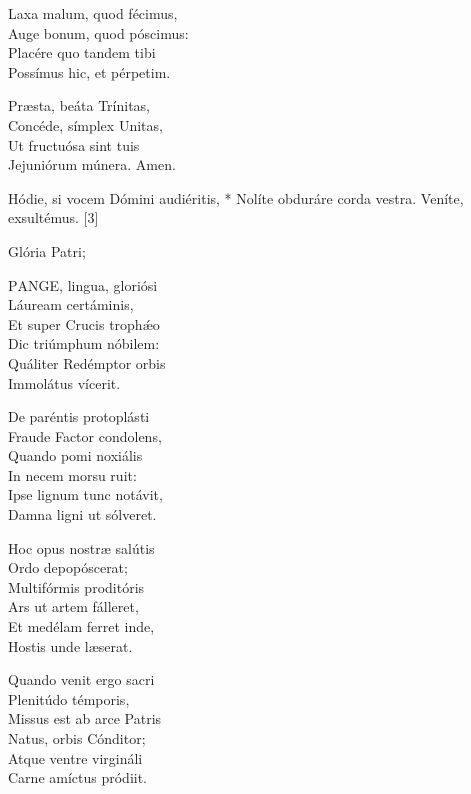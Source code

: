 Laxa malum, quod fécimus,\\
Auge bonum, quod póscimus:\\
Placére quo tandem tibi\\
Possímus hic, et pérpetim.

Præsta, beáta Trínitas,\\
Concéde, símplex Unitas,\\
Ut fructuósa sint tuis\\
Jejuniórum múnera. Amen.


 Hódie, si vocem Dómini audiéritis, * Nolíte obduráre corda vestra.  Veníte, exsultémus. [3]


 Glória Patri; 


\lettrine[lines=2]{P}{ANGE}, lingua, gloriósi\\
Láuream certáminis,\\
Et super Crucis trophǽo\\
Dic triúmphum nóbilem:\\
Quáliter Redémptor orbis\\
Immolátus vícerit.

De paréntis protoplásti\\
Fraude Factor condolens,\\
Quando pomi noxiális\\
In necem morsu ruit:\\
Ipse lignum tunc notávit,\\
Damna ligni ut sólveret.

Hoc opus nostræ salútis\\
Ordo depopóscerat;\\
Multifórmis proditóris\\
Ars ut artem fálleret,\\
Et medélam ferret inde,\\
Hostis unde læserat.

Quando venit ergo sacri\\
Plenitúdo témporis,\\
Missus est ab arce Patris\\
Natus, orbis Cónditor;\\
Atque ventre virgináli\\
Carne amíctus pródiit.


